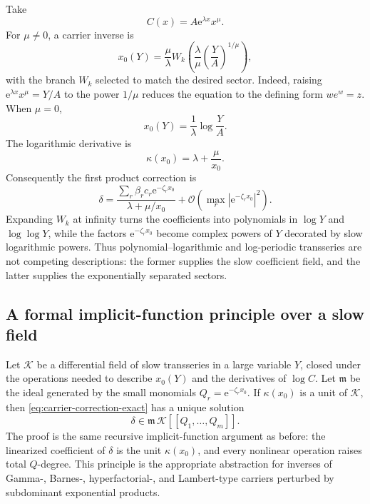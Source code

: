 \documentclass[11pt,oneside]{article}
\numberwithin{equation}{section}
\theoremstyle{plain}
\theoremstyle{definition}
\theoremstyle{remark}
\newcommand{\e}{\mathrm e}
\newcommand{\Ord}{\mathcal O}
\begin{document}
Take
\begin{equation}\label{eq:exp-power-carrier}
 C(x)=A\e^{\lambda x}x^\mu.
\end{equation}
For \(\mu\ne0\), a carrier inverse is
\begin{equation}\label{eq:x0-W}
 x_0(Y)=\frac\mu\lambda
 W_k\!\left(
   \frac\lambda\mu\left(\frac YA\right)^{1/\mu}
 \right),
\end{equation}
with the branch \(W_k\) selected to match the desired sector.  Indeed,
raising \(\e^{\lambda x}x^\mu=Y/A\) to the power \(1/\mu\) reduces the
equation to the defining form \(we^w=z\).  When \(\mu=0\),
\begin{equation}\label{eq:x0-pure-exp}
 x_0(Y)=\frac1\lambda\log\frac YA.
\end{equation}
The logarithmic derivative is
\begin{equation}\label{eq:kappa-exp-power}
 \kappa(x_0)=\lambda+\frac\mu{x_0}.
\end{equation}
Consequently the first product correction is
\begin{equation}\label{eq:first-W-sector}
 \delta=\frac{
   \sum_r\beta_rc_r\e^{-\zeta_rx_0}}
 {\lambda+\mu/x_0}
 +\Ord\!\left(\max_r|\e^{-\zeta_rx_0}|^2\right).
\end{equation}
Expanding \(W_k\) at infinity turns the coefficients into
polynomials in \(\log Y\) and \(\log\log Y\), while the factors
\(\e^{-\zeta_rx_0}\) become complex powers of \(Y\) decorated by slow
logarithmic powers.  Thus polynomial--logarithmic and log-periodic
transseries are not competing descriptions: the former supplies the slow
coefficient field, and the latter supplies the exponentially separated
sectors.

\subsection{A formal implicit-function principle over a slow field}

Let \(\mathscr K\) be a differential field of slow transseries in a large
variable \(Y\), closed under the operations needed to describe \(x_0(Y)\)
and the derivatives of \(\log C\).  Let \(\mathfrak m\) be the ideal
generated by the small monomials \(Q_r=\e^{-\zeta_rx_0}\).  If
\(\kappa(x_0)\) is a unit of \(\mathscr K\), then
\cref{eq:carrier-correction-exact} has a unique solution
\begin{equation}\label{eq:delta-slow-field}
 \delta\in\mathfrak m\,
 \mathscr K[[Q_1,\ldots,Q_m]].
\end{equation}
The proof is the same recursive implicit-function argument as before: the
linearized coefficient of \(\delta\) is the unit \(\kappa(x_0)\), and every
nonlinear operation raises total \(Q\)-degree.  This principle is the
appropriate abstraction for inverses of Gamma-, Barnes-, hyperfactorial-,
and Lambert-type carriers perturbed by subdominant exponential products.
\end{document}
